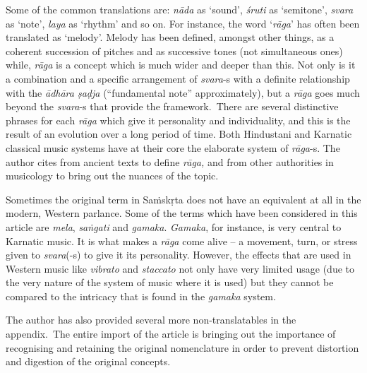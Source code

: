 Some of the common translations are: \textit{nāda} as ‘sound’, \textit{śruti} as ‘semitone’, \textit{svara} as ‘note’, \textit{laya} as ‘rhythm’ and so on. For instance, the word ‘\textit{rāga}’ has often been translated as ‘melody’. Melody has been defined, amongst other things, as a coherent succession of pitches and as successive tones (not simultaneous ones) while, \textit{rāga} is a concept which is much wider and deeper than this. Not only is it a combination and a specific arrangement of \textit{svara}-s with a definite relationship with the \textit{ādhāra ṣaḍja} (“fundamental note” approximately), but a \textit{rāga} goes much beyond the \textit{svara}-s that provide the framework.~There are several distinctive phrases for each \textit{rāga} which give it personality and individuality, and this is the result of an evolution over a long period of time. Both Hindustani and Karnatic classical music systems have at their core the elaborate system of \textit{rāga}-s. The author cites from ancient texts to define \textit{rāga,} and from other authorities in musicology to bring out the nuances of the topic.

Sometimes the original term in Saṁskṛta does not have an equivalent at all in the modern, Western parlance. Some of the terms which have been considered in this article are \textit{mela}, \textit{saṅgati} and \textit{gamaka}. \textit{Gamaka}, for instance, is very central to Karnatic music. It is what makes a \textit{rāga} come alive – a movement, turn, or stress given to \textit{svara}(-s) to give it its personality. However, the effects that are used in Western music like \textit{vibrato} and \textit{staccato} not only have very limited usage (due to the very nature of the system of music where it is used) but they cannot be compared to the intricacy that is found in the \textit{gamaka} system.

The author has also provided several more non-translatables in the appendix.~The entire import of the article is bringing out the importance of recognising and retaining the original nomenclature in order to prevent distortion and digestion of the original concepts.

